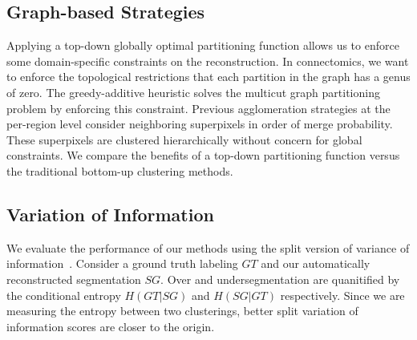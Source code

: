 \subsection{Graph-based Strategies}

Applying a top-down globally optimal partitioning function allows us to enforce some domain-specific constraints on the reconstruction.
In connectomics, we want to enforce the topological restrictions that each partition in the graph has a genus of zero. 
The greedy-additive heuristic solves the multicut graph partitioning problem by enforcing this constraint.
Previous agglomeration strategies at the per-region level consider neighboring superpixels in order of merge probability. 
These superpixels are clustered hierarchically without concern for global constraints.
We compare the benefits of a top-down partitioning function versus the traditional bottom-up clustering methods.

\subsection{Variation of Information}
\label{sec:variation-of-information}
We evaluate the performance of our methods using the split version of variance of information~\cite{meila2003comparing}. 
Consider a ground truth labeling $GT$ and our automatically reconstructed segmentation $SG$. 
Over and undersegmentation are quanitified by the conditional entropy $H(GT | SG)$ and $H(SG | GT)$ respectively. 
Since we are measuring the entropy between two clusterings, better split variation of information scores are closer to the origin.